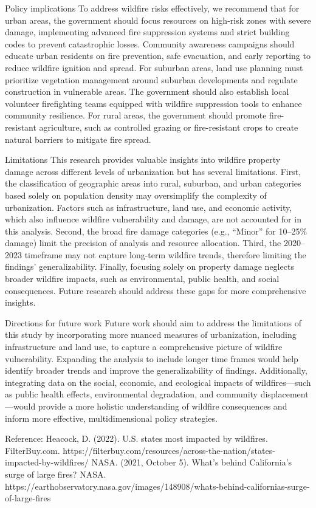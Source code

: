 \documentclass[
  letterpaper,
  DIV=11,
  numbers=noendperiod]{scrartcl}
\begin{document}
Policy implications To address wildfire risks effectively, we recommend
that for urban areas, the government should focus resources on high-risk
zones with severe damage, implementing advanced fire suppression systems
and strict building codes to prevent catastrophic losses. Community
awareness campaigns should educate urban residents on fire prevention,
safe evacuation, and early reporting to reduce wildfire ignition and
spread. For suburban areas, land use planning must prioritize vegetation
management around suburban developments and regulate construction in
vulnerable areas. The government should also establish local volunteer
firefighting teams equipped with wildfire suppression tools to enhance
community resilience. For rural areas, the government should promote
fire-resistant agriculture, such as controlled grazing or fire-resistant
crops to create natural barriers to mitigate fire spread.

Limitations This research provides valuable insights into wildfire
property damage across different levels of urbanization but has several
limitations. First, the classification of geographic areas into rural,
suburban, and urban categories based solely on population density may
oversimplify the complexity of urbanization. Factors such as
infrastructure, land use, and economic activity, which also influence
wildfire vulnerability and damage, are not accounted for in this
analysis. Second, the broad fire damage categories (e.g., ``Minor'' for
10--25\% damage) limit the precision of analysis and resource
allocation. Third, the 2020--2023 timeframe may not capture long-term
wildfire trends, therefore limiting the findings' generalizability.
Finally, focusing solely on property damage neglects broader wildfire
impacts, such as environmental, public health, and social consequences.
Future research should address these gaps for more comprehensive
insights.

Directions for future work Future work should aim to address the
limitations of this study by incorporating more nuanced measures of
urbanization, including infrastructure and land use, to capture a
comprehensive picture of wildfire vulnerability. Expanding the analysis
to include longer time frames would help identify broader trends and
improve the generalizability of findings. Additionally, integrating data
on the social, economic, and ecological impacts of wildfires---such as
public health effects, environmental degradation, and community
displacement---would provide a more holistic understanding of wildfire
consequences and inform more effective, multidimensional policy
strategies.

Reference: Heacock, D. (2022). U.S. states most impacted by wildfires.
FilterBuy.com.
https://filterbuy.com/resources/across-the-nation/states-impacted-by-wildfires/
NASA. (2021, October 5). What's behind California's surge of large
fires? NASA.
https://earthobservatory.nasa.gov/images/148908/whats-behind-californias-surge-of-large-fires
\end{document}
